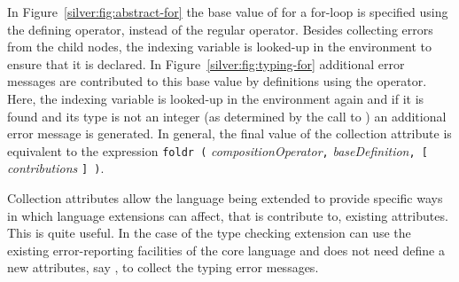 In Figure~\ref{silver:fig:abstract-for} the base value of
 for a for-loop is specified using the \code{:=} defining
operator, instead of the regular \code{=} operator.  Besides
collecting errors from the child nodes, the indexing variable is
looked-up in the environment to ensure that it is declared.  In
Figure~\ref{silver:fig:typing-for} additional error messages are
contributed to this base value by definitions using the \code{<-}
operator.  Here, the indexing variable is looked-up in the
environment again and if it is found and its type is not an integer
(as determined by the call to ) an additional error
message is generated.
%
In general, the final value of the collection attribute is equivalent
to the expression \texttt{foldr (}
\emph{compositionOperator}\texttt{,} \emph{baseDefinition}\texttt{, [}
\emph{contributions} \texttt{] )}.


Collection attributes allow the language being extended to provide
specific ways in which language extensions can affect, that is
contribute to, existing attributes.
%
This is quite useful.  In the case of  the type checking
extension can use the existing error-reporting facilities of the core
language and does not need define a new attributes, say
, to collect the typing error messages.


\begin{comment}
%
Instead, they are purely within one production, and contributions instead come
from all aspects of that production, along with an initial ``base" definition:
\begin{verbatim}
abstract production not
e::Expr ::= e1::Expr
{ e.errors := e1.errors;  -- Other attributes omitted
}
\end{verbatim}
%
%
The final value of the collection attribute is equivalent to the
expression \texttt{foldr (} \emph{compositionOperator}\texttt{,}
    \emph{baseDefinition}\texttt{, [} \emph{contributions} \texttt{] )}.

This design is intended to tightly control the possible misbehavior of
extensions.
%
Extensions are forbidden from doing anything ``dangerous" by default,
and the host language can poke well-defined holes to permit specific
kinds of extension behavior.
\end{comment}



